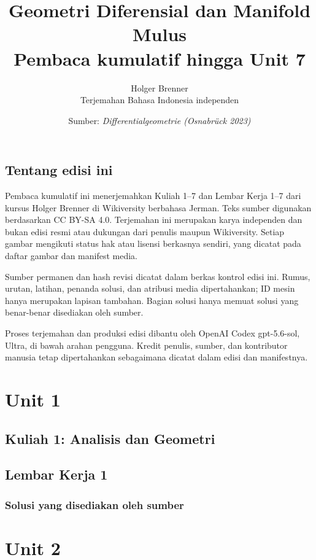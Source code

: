 \documentclass[11pt,a4paper,oneside]{book}
\title{Geometri Diferensial dan Manifold Mulus\\\large Pembaca kumulatif hingga Unit 7}
\author{Holger Brenner\\Terjemahan Bahasa Indonesia independen}
\date{Sumber: \textit{Differentialgeometrie (Osnabrück 2023)}}
\begin{document}
\hypersetup{pageanchor=false}
\maketitle
\hypersetup{pageanchor=true}
\frontmatter
\chapter*{Tentang edisi ini}
Pembaca kumulatif ini menerjemahkan Kuliah 1--7 dan Lembar Kerja 1--7 dari kursus Holger Brenner di Wikiversity berbahasa Jerman. Teks sumber digunakan berdasarkan CC BY-SA 4.0. Terjemahan ini merupakan karya independen dan bukan edisi resmi atau dukungan dari penulis maupun Wikiversity. Setiap gambar mengikuti status hak atau lisensi berkasnya sendiri, yang dicatat pada daftar gambar dan manifest media.

Sumber permanen dan hash revisi dicatat dalam berkas kontrol edisi ini. Rumus, urutan, latihan, penanda solusi, dan atribusi media dipertahankan; ID mesin hanya merupakan lapisan tambahan. Bagian solusi hanya memuat solusi yang benar-benar disediakan oleh sumber.

Proses terjemahan dan produksi edisi dibantu oleh OpenAI Codex gpt-5.6-sol, Ultra, di bawah arahan pengguna. Kredit penulis, sumber, dan kontributor manusia tetap dipertahankan sebagaimana dicatat dalam edisi dan manifestnya.
\tableofcontents

\mainmatter
\part{Unit 1}
\chapter[Kuliah 1]{Kuliah 1: Analisis dan Geometri}


\chapter{Lembar Kerja 1}


\section*{Solusi yang disediakan oleh sumber}


\part{Unit 2}
\end{document}
